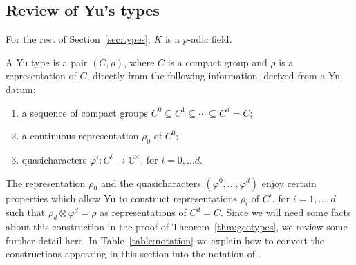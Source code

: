 \documentclass[10pt]{amsart}
\makeatletter
\theoremstyle{plain}
\theoremstyle{definition}
\newcommand{\CC}{{\mathbb{C}}}
\newcommand{\labitem}[2]{
\def\@itemlabel{\textbf{#1}}
\item
\def\@currentlabel{#1}\label{#2}}
\makeatother
\begin{document}
\subsection{Review of Yu's types}\label{ssec:review}

For the rest of Section~\ref{sec:types}, $K$ is a $p$-adic field.


A Yu type is a pair $(C,\rho)$, where $C$ is a compact group and $\rho$ is a representation of $C$, directly from the following information, derived from a Yu datum:
\begin{enumerate}
\labitem{Y0}{Y0} a sequence of compact groups $C^0 \subseteq C^1 \subseteq \cdots \subseteq C^d= C$;
\labitem{Y1}{Y1} a continuous representation $\rho_0$ of $C^0$;
\labitem{Y2}{Y2} quasicharacters $\varphi^i : C^i \to \CC^\times$, for $i=0, \ldots d$.
\end{enumerate}
%
The representation $\rho_0$ and the quasicharacters $(\varphi^0, \ldots , \varphi^d)$ enjoy certain properties which allow Yu to construct representations $\rho_i$ of $C^i$, for $i=1, \ldots, d$ such that $\rho_d \otimes \varphi^d = \rho$ as representations of $C^d = C$.
%
Since we will need some facts about this construction in the proof of Theorem~\ref{thm:geotypes}, we review some further detail here.
In Table~\ref{table:notation} we explain how to convert the constructions appearing in this section into the notation of \cite{yu:01a}.
\end{document}
